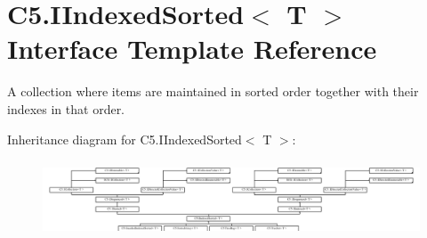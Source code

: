 \hypertarget{interface_c5_1_1_i_indexed_sorted}{}\section{C5.\+I\+Indexed\+Sorted$<$ T $>$ Interface Template Reference}
\label{interface_c5_1_1_i_indexed_sorted}


A collection where items are maintained in sorted order together with their indexes in that order.  


Inheritance diagram for C5.\+I\+Indexed\+Sorted$<$ T $>$\+:\begin{figure}[H]
\begin{center}
\leavevmode
\includegraphics[height=2.300470cm]{interface_c5_1_1_i_indexed_sorted}
\end{center}
\end{figure}

